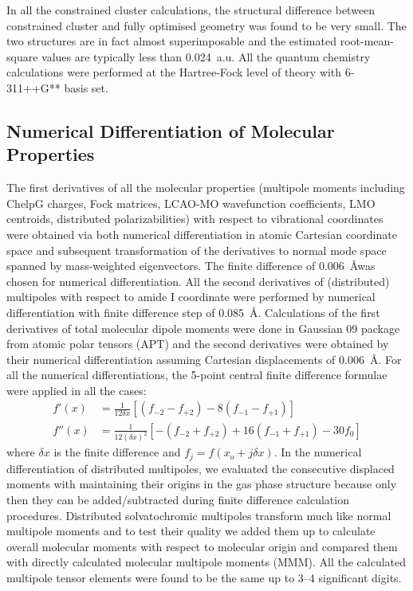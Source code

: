 \documentclass[b5paper,oneside,fleqn,11pt]{book}
\begin{document}
\begin{appendices}
\begin{refsection}
In all the constrained cluster calculations, the
structural difference between constrained cluster and fully
optimised geometry was found to be very small. The two
structures are in fact almost superimposable and the estimated
root\hyp{}mean\hyp{}square values are typically less than 0.024~a.u. 
All the quantum chemistry calculations were performed
at the Hartree\hyp{}Fock level of theory \citep{Roothaan.RevModPhys.1951} 
with 6-311++G** basis
set. \citep{Krishnan.Binkley.Seeger.Pople.JCP.1980,
McLean.Chandler.JCP.1980}

\subsection{Numerical Differentiation of Molecular Properties}

The first derivatives of all the molecular properties
(multipole moments including ChelpG charges, Fock matrices, LCAO\hyp{}MO
wavefunction coefficients, LMO centroids, distributed polarizabilities)
with respect to
vibrational coordinates were obtained via both numerical differentiation
in atomic Cartesian coordinate space and subsequent
transformation of the derivatives to normal mode space
spanned by mass\hyp{}weighted eigenvectors. The finite difference
of 0.006~\AA was chosen for numerical differentiation. All the
second derivatives of (distributed) multipoles with respect to
amide I coordinate were performed by numerical differentiation
with finite difference step of 0.085~\AA. Calculations
of the first derivatives of total molecular dipole moments
were done in {\sc Gaussian 09} package from atomic polar
tensors (APT) and the second derivatives were obtained by
their numerical differentiation assuming Cartesian displacements
of 0.006~\AA. For all the numerical differentiations, the
5\hyp{}point central finite difference formulae were applied in all the
cases:
%
\begin{subequations}
 \begin{align}
   f'(x) &= \frac{1}{12\delta x} \left[
 \left( f_{-2} - f_{+2} \right) - 
8\left( f_{-1} - f_{+1} \right)
\right] \\
  f''(x) &= \frac{1}{12(\delta x)^2} \left[
 -\left( f_{-2} + f_{+2} \right) + 
16\left( f_{-1} + f_{+1} \right) - 30f_0
\right]
 \end{align}
\end{subequations}
%
where $\delta x$ is the finite difference and $f_j = f(x_o + j\delta x)$. 
In the
numerical differentiation of distributed multipoles, we evaluated
the consecutive displaced moments with maintaining
their origins in the gas phase structure because only then they
can be added/subtracted during finite difference calculation
procedures. Distributed solvatochromic multipoles transform
much like normal multipole moments and to test their quality
we added them up to calculate overall molecular moments
with respect to molecular origin and compared them with directly
calculated molecular multipole moments (MMM). All
the calculated multipole tensor elements were found to be the
same up to 3--4 significant digits.


\end{refsection}
\end{appendices}
\end{document}

